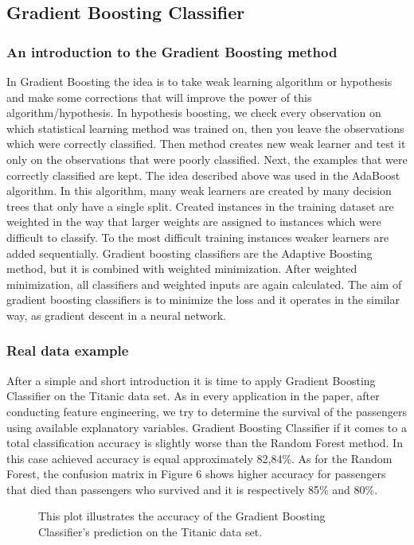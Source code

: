 \subsection{Gradient Boosting Classifier}
\label{sec:gradient_boosting}

\subsubsection{An introduction to the Gradient Boosting method}
In Gradient Boosting the idea is to take weak learning algorithm or hypothesis and make some corrections that will improve the power of this algorithm/hypothesis. In hypothesis boosting, we check every observation on which statistical learning method was trained on, then you leave the observations which were correctly classified. Then method creates new weak learner and test it only on the observations that were poorly classified. Next, the examples that were correctly classified are kept.
The idea described above was used in the AdaBoost algorithm. In this algorithm, many weak learners are created by many decision trees that only have a single split. Created instances in the training dataset are weighted in the way that larger weights are assigned to instances which were difficult to classify. To the most difficult training instances weaker learners are added sequentially.
Gradient boosting classifiers are the Adaptive Boosting method, but it is combined with weighted minimization. After weighted minimization, all classifiers and weighted inputs are again calculated. The aim of gradient boosting classifiers is to minimize the loss and it operates in the similar way, as gradient descent in a neural network.
\subsubsection{Real data example}

After a simple and short introduction it is time to apply Gradient Boosting Classifier on the Titanic data set. As in every application in the paper,
after conducting feature engineering, we try to determine the survival of the passengers using available explanatory variables. 
Gradient Boosting Classifier if it comes to a total classification accuracy is slightly worse than the Random Forest method. In this case achieved accuracy is equal
approximately 82,84\%. 
As for the Random Forest, the confusion matrix in Figure 6
shows higher accuracy for passengers that died than passengers who survived and it is respectively 85\% and 80\%.


\begin{figure}[H]
    \captionsetup{format=plain}
    \caption{This plot illustrates the accuracy of the Gradient Boosting Classifier's prediction on
             the Titanic data set.}
    \label{fig:confusion_matrix_gradient_boosting}
\end{figure}

